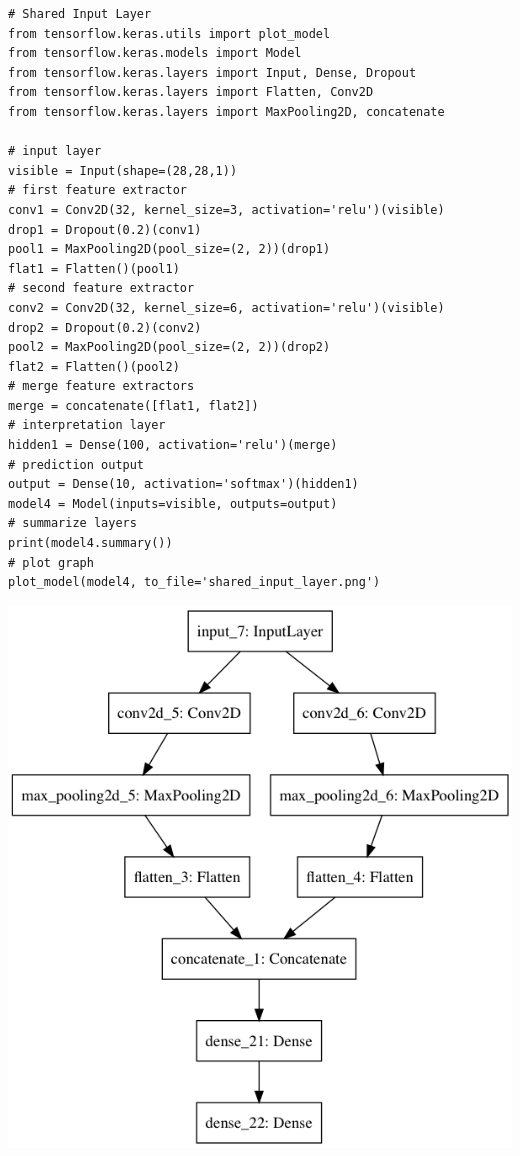\documentclass[11pt]{article}
\begin{document}
\begin{minipage}{0.6\linewidth}
	\begin{verbatim}
# Shared Input Layer
from tensorflow.keras.utils import plot_model
from tensorflow.keras.models import Model
from tensorflow.keras.layers import Input, Dense, Dropout
from tensorflow.keras.layers import Flatten, Conv2D
from tensorflow.keras.layers import MaxPooling2D, concatenate

# input layer
visible = Input(shape=(28,28,1))
# first feature extractor
conv1 = Conv2D(32, kernel_size=3, activation='relu')(visible)
drop1 = Dropout(0.2)(conv1)
pool1 = MaxPooling2D(pool_size=(2, 2))(drop1)
flat1 = Flatten()(pool1)
# second feature extractor
conv2 = Conv2D(32, kernel_size=6, activation='relu')(visible)
drop2 = Dropout(0.2)(conv2)
pool2 = MaxPooling2D(pool_size=(2, 2))(drop2)
flat2 = Flatten()(pool2)
# merge feature extractors
merge = concatenate([flat1, flat2])
# interpretation layer
hidden1 = Dense(100, activation='relu')(merge)
# prediction output
output = Dense(10, activation='softmax')(hidden1)
model4 = Model(inputs=visible, outputs=output)
# summarize layers
print(model4.summary())
# plot graph
plot_model(model4, to_file='shared_input_layer.png')
	\end{verbatim}
\end{minipage}
\begin{minipage}{0.4\linewidth}
	\begin{center}
		\includegraphics[width=\linewidth]{img/keras_funcitonal_api_multiple_path_cnn}
	\end{center}
\end{minipage}
\end{document}
